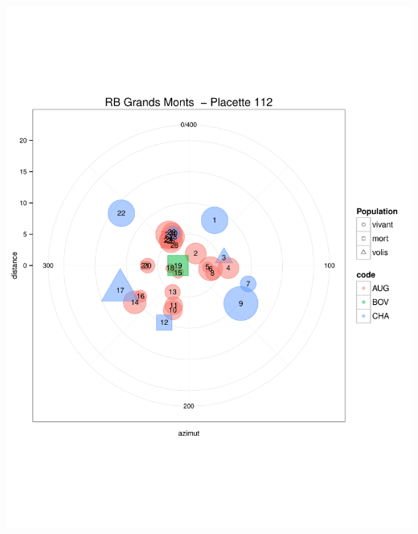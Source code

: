 \documentclass[a4paper]{book}\usepackage[]{graphicx}\usepackage[]{color}
\makeatletter
\def\maxwidth{ %
  \ifdim\Gin@nat@width>\linewidth
    \linewidth
  \else
    \Gin@nat@width
  \fi
}
\newenvironment{knitrout}{}{} %
\makeatother
\begin{document}
\begin{knitrout}
{\centering \includegraphics[width=\maxwidth]{Figures/PlanArbres-3} 

}





\end{knitrout}
\end{document}
